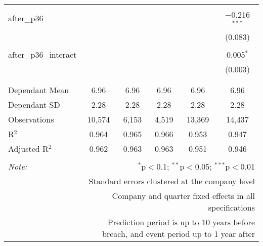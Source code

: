 \begin{table}[!htbp]
\begin{tabular}{@{\extracolsep{5pt}}lccccc}
  & & & & & \\ 
 after\_p36 &  &  &  &  & $-$0.216$^{***}$ \\ 
  &  &  &  &  & (0.083) \\ 
  & & & & & \\ 
 after\_p36\_interact &  &  &  &  & 0.005$^{*}$ \\ 
  &  &  &  &  & (0.003) \\ 
  & & & & & \\ 
\hline \\[-1.8ex] 
Dependant Mean & 6.96 & 6.96 & 6.96 & 6.96 & 6.96 \\ 
Dependant SD & 2.28 & 2.28 & 2.28 & 2.28 & 2.28 \\ 
Observations & 10,574 & 6,153 & 4,519 & 13,369 & 14,437 \\ 
R$^{2}$ & 0.964 & 0.965 & 0.966 & 0.953 & 0.947 \\ 
Adjusted R$^{2}$ & 0.962 & 0.963 & 0.963 & 0.951 & 0.946 \\ 
\hline 
\hline \\[-1.8ex] 
\textit{Note:}  & \multicolumn{5}{r}{$^{*}$p$<$0.1; $^{**}$p$<$0.05; $^{***}$p$<$0.01} \\ 
 & \multicolumn{5}{r}{Standard errors clustered at the company level} \\ 
 & \multicolumn{5}{r}{Company and quarter fixed effects in all specifications} \\ 
 & \multicolumn{5}{r}{Prediction period is up to 10 years before breach, and event period up to 1 year after} \\ 
\end{tabular} 
\end{table} 
